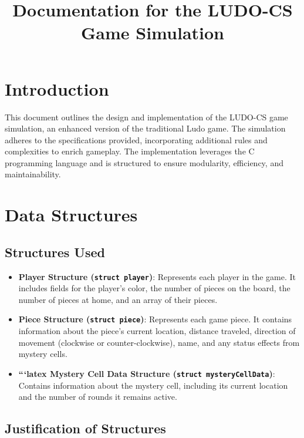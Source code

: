 \documentclass{article}
\title{Documentation for the LUDO-CS Game Simulation}
\author{}
\date{}
\begin{document}
\maketitle

\section{Introduction}
This document outlines the design and implementation of the LUDO-CS game simulation, an enhanced version of the traditional Ludo game. The simulation adheres to the specifications provided, incorporating additional rules and complexities to enrich gameplay. The implementation leverages the C programming language and is structured to ensure modularity, efficiency, and maintainability.

\section{Data Structures}

\subsection{Structures Used}

\begin{itemize}
    \item \textbf{Player Structure (\texttt{struct player})}: Represents each player in the game. It includes fields for the player's color, the number of pieces on the board, the number of pieces at home, and an array of their pieces.
    
    \item \textbf{Piece Structure (\texttt{struct piece})}: Represents each game piece. It contains information about the piece’s current location, distance traveled, direction of movement (clockwise or counter-clockwise), name, and any status effects from mystery cells.
    
    \item \textbf{```latex
    Mystery Cell Data Structure (\texttt{struct mysteryCellData})}: Contains information about the mystery cell, including its current location and the number of rounds it remains active.
    \end{itemize}
    
    \subsection{Justification of Structures}
    
\end{document}
